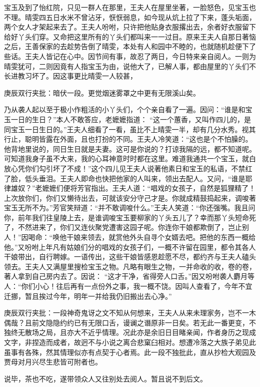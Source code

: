 \begin{parag}


    宝玉及到了怡红院，只见一群人在那里，王夫人在屋里坐著，一脸怒色，见宝玉也不理。晴雯四五日水米不曾沾牙，恹恹弱息，如今现从炕上拉了下来，蓬头垢面，两个女人才架起来去了。王夫人吩咐，只许把他贴身衣服撂出去，余者好衣服留下给好丫头们穿。又命把这里所有的丫头们都叫来一一过目。原来王夫人自那日著恼之后，王善保家的去趁势告倒了晴雯，本处有人和园中不睦的，也就随机趁便下了些话。王夫人皆记在心中。因节间有事，故忍了两日，今日特来亲自阅人。一则为晴雯犹可，二则因竟有人指宝玉为由，说他大了，已解人事，都由屋里的丫头们不长进教习坏了。因这事更比晴雯一人较甚，\begin{note}庚辰双行夹批：暗伏一段。更觉烟迷雾罩之中更有无限溪山矣。\end{note}乃从袭人起以至于极小作粗活的小丫头们，个个亲自看了一遍。因问：“谁是和宝玉一日的生日？”本人不敢答应，老嬷嬷指道： “这一个蕙香，又叫作四儿的，是同宝玉一日生日的。”王夫人细看了一看，虽比不上晴雯一半，却有几分水秀。视其行止，聪明皆露在外面，且也打扮的不同。王夫人冷笑道：“这也是个不怕臊的。他背地里说的，同日生日就是夫妻。这可是你说的？打谅我隔的远，都不知道呢。可知道我身子虽不大来，我的心耳神意时时都在这里。难道我通共一个宝玉，就白放心凭你们勾引坏了不成！”这个四儿见王夫人说著他素日和宝玉的私语，不禁红了脸，低头垂泪。王夫人即命也快把他家的人叫来，领出去配人。又问，“谁是耶律雄奴？”老嬷嬷们便将芳官指出。王夫人道：“唱戏的女孩子，自然是狐狸精了！上次放你们，你们又懒待出去，可就该安分守己才是。你就成精鼓捣起来，调唆著宝玉无所不为。”芳官笑辩道：“并不敢调唆什么。”王夫人笑道：“你还强嘴。我且问你，前年我们往皇陵上去，是谁调唆宝玉要柳家的丫头五儿了？幸而那丫头短命死了，不然进来了，你们又连伙聚党遭害这园子呢。你连你干娘都欺倒了，岂止别人！”因喝命：“唤他干娘来领去，就赏他外头自寻个女婿去吧。把他的东西一概给他。”又吩咐上年凡有姑娘们分的唱戏的女孩子们，一概不许留在园里，都令其各人干娘带出，自行聘嫁。一语传出，这些干娘皆感恩趁愿不尽，都约齐与王夫人磕头领去。王夫人又满屋里搜检宝玉之物。凡略有眼生之物，一并命收的收，卷的卷，著人拿到自己房内去了。因说： “这才干净，省得旁人口舌。”因又吩咐袭人麝月等人：“你们小心！往后再有一点份外之事，我一概不饶。因叫人查看了，今年不宜迁挪，暂且挨过今年，明年一并给我仍旧搬出去心净。”\begin{note}庚辰双行夹批：一段神奇鬼讶之文不知从何想来，王夫人从来未理家务，岂不一木偶哉？且前文隐隐约约已有无限口舌，谩谰之谮原非一日矣。若无此一番更变，不独终无散场之局，且亦大不近乎情理。况此亦是余旧日目睹亲闻，作者身历之现成文字，非捏造而成者，故迥不与小说之离合悲窠臼相对。想遭冷落之大族子弟见此虽事有各殊，然其情理似亦有点契于心者焉。此一段不独批此，直从抄检大观园及贾母对月兴尽生悲皆可附者也。\end{note}说毕，茶也不吃，遂带领众人又往别处去阅人。暂且说不到后文。
\end{parag}


